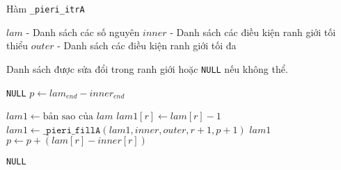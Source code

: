 \documentclass[11pt,a4paper]{book}
\begin{document}
\begin{algorithm}
	\caption{Hàm \texttt{\_pieri\_itrA}}
	\begin{algorithmic}[1] %
	
	\Require 
	\State $lam$ - Danh sách các số nguyên
	\State $inner$ - Danh sách các điều kiện ranh giới tối thiểu
	\State $outer$ - Danh sách các điều kiện ranh giới tối đa
	
	\Ensure Danh sách được sửa đổi trong ranh giới hoặc \texttt{NULL} nếu không thể.
	
		\State \Return \texttt{NULL} 
	\EndIf
	\State $p \leftarrow lam_{end} - inner_{end}$ 
	
	 
			\State $lam1 \leftarrow \text{bản sao của } lam$
			\State $lam1[r] \leftarrow lam[r] - 1$ 
			\State $lam1 \leftarrow \texttt{\_pieri\_fillA}(lam1, inner, outer, r+1, p+1)$ 
				\State \Return $lam1$ 
			\EndIf
			\State $p \leftarrow p + (lam[r] - inner[r])$ 
		\EndIf
	\EndFor
	
	\State \Return \texttt{NULL} 
	
	\end{algorithmic}
\end{algorithm}
\end{document}
